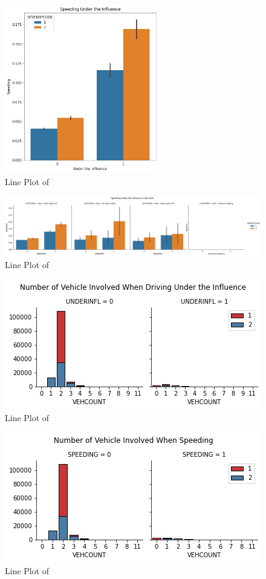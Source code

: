 \documentclass[a4paper,12pt]{article}
\begin{document}
\begin{figure}[]
	\centering
	\includegraphics[width=0.6\textwidth]{un_sp_sev.jpg}
	\caption{Line Plot of}
	\label{fig1}
\end{figure}

\begin{figure}[]
	\centering
	\includegraphics[width=1.0\textwidth]{un_sp_sev_lig.jpg}
	\caption{Line Plot of}
	\label{fig1}
\end{figure}

\begin{figure}[]
	\centering
	\includegraphics[width=1.0\textwidth]{un_sev_hist.jpg}
	\caption{Line Plot of}
	\label{fig1}
\end{figure}

\begin{figure}[]
	\centering
	\includegraphics[width=1.0\textwidth]{sp_sev_hist.jpg}
	\caption{Line Plot of}
	\label{fig1}
\end{figure}
\end{document}
